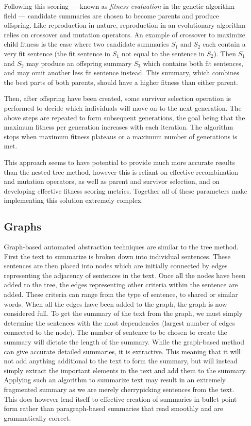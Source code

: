 Following this scoring --- known as {\em fitness evaluation} in the genetic algorithm field --- candidate summaries are chosen to become parents and produce offspring. Like reproduction in nature, reproduction in an evolutionary algorithm relies on crossover and mutation operators. An example of crossover to maximize child fitness is the case where two candidate summaries $S_1$ and $S_2$ each contain a very fit sentence (the fit sentence in $S_1$ not equal to the sentence in $S_2$). Then $S_1$ and $S_2$ may produce an offspring summary $S_3$ which contains both fit sentences, and may omit another less fit sentence instead. This summary, which combines the best parts of both parents, should have a higher fitness than either parent.

Then, after offspring have been created, some survivor selection operation is performed to decide which individuals will move on to the next generation. The above steps are repeated to form subsequent generations, the goal being that the maximum fitness per generation increases with each iteration. The algorithm stops when maximum fitness plateaus or a maximum number of generations is met.

This approach seems to have potential to provide much more accurate results than the nested tree method, however this is reliant on effective recombination and mutation operators, as well as parent and survivor selection, and on developing effective fitness scoring metrics. Together all of these parameters make implementing this solution extremely complex.


\subsection{Graphs}
Graph-based automated abstraction techniques are similar to the tree method. First the text to summarize is broken down into individual sentences. These sentences are then placed into nodes which are initially connected by edges representing the adjacency of sentences in the text. Once all the nodes have been added to the tree, the edges representing other criteria within the sentence are added. These criteria can range from the type of sentence, to shared or similar words. When all the edges have been added to the graph, the graph is now considered full. To get the summary of the text from the graph, we must simply determine the sentences with the most dependencies (\ie largest number of edges connected to the node). The number of sentence to be chosen to create the summary will dictate the length of the summary. While the graph-based method can give accurate detailed summaries, it is extractive. This meaning that it will not add anything additional to the text to form the summary, but will instead simply extract the important elements in the text and add them to the summary.
Applying such an algorithm to summarize text may result in an extremely fragmented summary as we are merely cherrypicking sentences from the text. This does however lend itself to effective creation of summaries in bullet point form rather than paragraph-based summaries that read smoothly and are grammatically correct.
